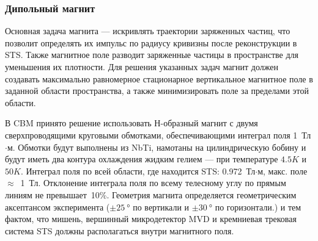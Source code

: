 
\subsubsection{Дипольный магнит}\label{sec:secMagnet}

Основная задача магнита --- искривлять траектории заряженных частиц, что позволит определять их импульс по радиусу кривизны после реконструкции в STS. Также магнитное поле разводит заряженные частицы в пространстве для уменьшения их плотности. Для решения указанных задач магнит должен создавать максимально равномерное стационарное вертикальное магнитное поле в заданной области пространства, а также минимизировать поле за пределами этой области.

В CBM принято решение использовать Н-образный магнит с двумя сверхпроводящими круговыми обмотками, обеспечивающими интеграл поля 1~Тл$\cdot$м. Обмотки будут выполнены из NbTi, намотаны на цилиндрическую бобину и будут иметь два контура охлаждения жидким гелием --- при температуре $4.5K$ и $50K$.
Интеграл поля по всей области, где находится STS: 0.972~Тл$\cdot$м, макс. поле $\approx$~1~Тл. Отклонение интеграла поля по всему телесному углу по прямым линиям не превышает~10\%.
Геометрия магнита
определяется геометрическим аксептансом эксперимента ($\pm \SI{25}{\degree}$ по вертикали и $\pm \SI{30}{\degree}$ по горизонтали.) и тем фактом, что мишень, вершинный микродетектор MVD и кремниевая трековая система STS должны располагаться внутри магнитного поля.

